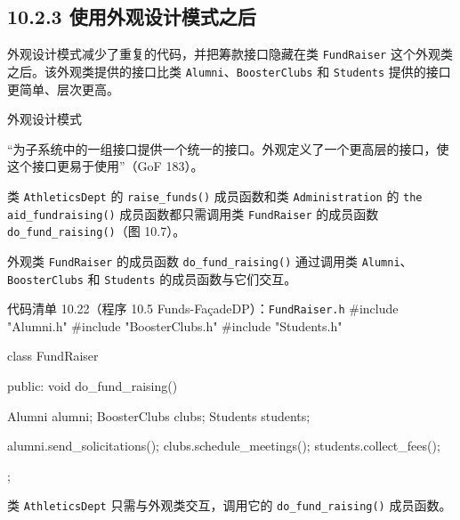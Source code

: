 \subsection{10.2.3 使用外观设计模式之后}

外观设计模式减少了重复的代码，并把筹款接口隐藏在类 \texttt{Fund\allowbreak{}Raiser} 这个外观类之后。该外观类提供的接口比类 \texttt{Alumni}、\texttt{Booster\allowbreak{}Clubs} 和 \texttt{Students} 提供的接口更简单、层次更高。

\begin{mySidebar}{外观设计模式}

“为子系统中的一组接口提供一个统一的接口。外观定义了一个更高层的接口，使这个接口更易于使用”（GoF 183）。
\end{mySidebar}

类 \texttt{Athletics\allowbreak{}Dept} 的 \texttt{raise\_\allowbreak{}funds(\allowbreak{})\allowbreak{}} 成员函数和类 \texttt{Administration} 的 \texttt{the aid\_\allowbreak{}fundraising(\allowbreak{})\allowbreak{}} 成员函数都只需调用类 \texttt{Fund\allowbreak{}Raiser} 的成员函数 \texttt{do\_\allowbreak{}fund\_\allowbreak{}raising(\allowbreak{})\allowbreak{}}（图 10.7）。


外观类 \texttt{Fund\allowbreak{}Raiser} 的成员函数 \texttt{do\_\allowbreak{}fund\_\allowbreak{}raising(\allowbreak{})\allowbreak{}} 通过调用类 \texttt{Alumni}、\texttt{Booster\allowbreak{}Clubs} 和 \texttt{Students} 的成员函数与它们交互。

\begin{codeboxt}{代码清单 10.22（程序 10.5 Funds-FaçadeDP）：\texttt{Fund\allowbreak{}Raiser.\allowbreak{}h}}
#include "Alumni.h"
#include "BoosterClubs.h"
#include "Students.h"

class FundRaiser
{
public:
    void do_fund_raising()
    {
        Alumni alumni;
        BoosterClubs clubs;
        Students students;

        alumni.send_solicitations();
        clubs.schedule_meetings();
        students.collect_fees();
    }
};
\end{codeboxt}

类 \texttt{Athletics\allowbreak{}Dept} 只需与外观类交互，调用它的 \texttt{do\_\allowbreak{}fund\_\allowbreak{}raising(\allowbreak{})\allowbreak{}} 成员函数。

